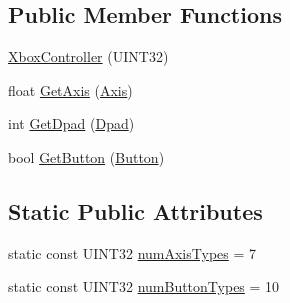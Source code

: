 \subsection*{\-Public \-Member \-Functions}
\begin{DoxyCompactItemize}
\item 
\hyperlink{class_xbox_controller_a4997ad3f55831f6cd88fca25a91fb9a6}{\-Xbox\-Controller} (\-U\-I\-N\-T32)
\item 
float \hyperlink{class_xbox_controller_a9a7065dde4023b343649f4a05792f2a0}{\-Get\-Axis} (\hyperlink{class_xbox_controller_a4f6e97fd0254e4762fa46def0daf8984}{\-Axis})
\item 
int \hyperlink{class_xbox_controller_a8c03925e5cd3b017e8561c951c3c34bb}{\-Get\-Dpad} (\hyperlink{class_xbox_controller_a2cf07e63fc6d085896f440ff336b8c3a}{\-Dpad})
\item 
bool \hyperlink{class_xbox_controller_a7e7d2cc4101c30502c28f54796c90968}{\-Get\-Button} (\hyperlink{class_xbox_controller_a904db96e1804a0401fdb4899d7694b69}{\-Button})
\end{DoxyCompactItemize}
\subsection*{\-Static \-Public \-Attributes}
\begin{DoxyCompactItemize}
\item 
static const \-U\-I\-N\-T32 \hyperlink{class_xbox_controller_a3c057c67c58445ef06e67e4abc4c8b63}{num\-Axis\-Types} = 7
\item 
static const \-U\-I\-N\-T32 \hyperlink{class_xbox_controller_a41eb8f23c5f4e4fd9a9807d8ff0adbea}{num\-Button\-Types} = 10
\end{DoxyCompactItemize}


